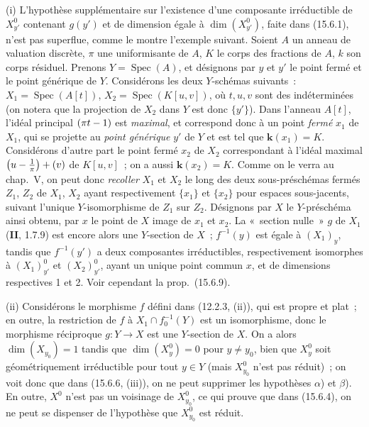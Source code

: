 \begin{remarks}[15.6.10]
(i) L'hypothèse supplémentaire sur l'existence d'une composante irréductible de $X_{y'}^0$ contenant $g(y')$ et de dimension égale à $\dim(X_{y'}^0)$, faite dans (15.6.1), n'est pas superflue, comme le montre l'exemple suivant. Soient $A$ un anneau de valuation discrète, $\pi$ une uniformisante de $A$, $K$ le corps des fractions de $A$, $k$ son corps résiduel. Prenons $Y=\operatorname{Spec}(A)$, et désignons par $y$ et $y'$ le point fermé et le point générique de $Y$. Considérons les deux $Y$-schémas suivants~: $X_1=\operatorname{Spec}(A[t])$, $X_2=\operatorname{Spec}(K[u,v])$, où $t,u,v$ sont des indéterminées (on notera que la projection de $X_2$ dans $Y$ est donc $\{y'\}$). Dans l'anneau $A[t]$, l'idéal principal $(\pi t- 1)$ est \emph{maximal}, et correspond donc à un point \emph{fermé} $x_1$ de $X_1$, qui se projette au \emph{point générique} $y'$ de $Y$ et est tel que $\boldsymbol{k}(x_1)=K$.
Considérons d'autre part le point fermé $x_2$ de $X_2$ correspondant à l'idéal maximal $\left(u-\frac{1}{\pi}\right)+(v)$ de $K[u,v]$~; on a aussi $\boldsymbol{k}(x_2)=K$. Comme on le verra au chap.~V, on peut donc \emph{recoller} $X_1$ et $X_2$ le long des deux sous-préschémas fermés $Z_1$, $Z_2$ de $X_1$, $X_2$ ayant respectivement $\{x_1\}$ et $\{x_2\}$ pour espaces sous-jacents, suivant l'unique $Y$-isomorphisme de $Z_1$ sur $Z_2$. Désignons par $X$ le $Y$-préschéma ainsi obtenu, par $x$ le point de $X$ image de $x_1$ et $x_2$. La «~section nulle~» $g$ de $X_1$ (\textbf{II}, 1.7.9) est encore alors une $Y$-section de $X$~; $f^{-1}(y)$ est égale à $(X_1)_y$, tandis que $f^{-1}(y')$ a deux composantes irréductibles, respectivement isomorphes à $(X_1)_{y'}^0$ et $(X_2)_{y'}^0$, ayant un unique point commun $x$, et de dimensions respectives 1 et 2. Voir cependant la prop.~(15.6.9).

(ii) Considérons le morphisme $f$ défini dans (12.2.3, (ii)), qui est propre et plat~; en outre, la restriction de $f$ à $X_1\cap f_0^{-1}(Y)$ est un isomorphisme, donc le morphisme réciproque $g:Y\to X$ est une $Y$-section de $X$. On a alors $\dim(X_{y_0})=1$ tandis que $\dim(X_y^0)=0$ pour $y\ne y_0$, bien que $X_y^0$ soit géométriquement irréductible pour tout $y\in Y$ (mais $X_{y_0}^0$ n'est pas réduit)~; on voit donc que dans (15.6.6, (iii)), on ne peut supprimer les hypothèses $\alpha$) et $\beta$). En outre, $X^0$ n'est pas un voisinage de $X_{y_0}^{0}$, ce qui prouve que dans (15.6.4), on ne peut se dispenser de l'hypothèse que $X_{y_0}^0$ est réduit.


\end{remarks}
